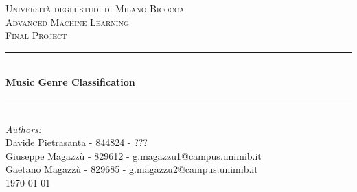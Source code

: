 \begin{titlepage}

    \newcommand{\HRule}{\rule{\linewidth}{0.5mm}} %

    \center %


    \textsc{\LARGE Università degli studi di Milano-Bicocca}\\[1cm] %
    \textsc{\Large Advanced Machine Learning }\\[0.3cm] %
    \textsc{\large Final Project}\\[0.1cm] %


    \HRule \\[0.4cm]
    { \huge \bfseries Music Genre Classification}\\[0.4cm] %
    \HRule \\[1.5cm]


    \large
    \emph{Authors:}\\
    Davide Pietrasanta - 844824 - ??? \\   %
    Giuseppe Magazzù - 829612 - g.magazzu1@campus.unimib.it   \\ %
    Gaetano Magazzù - 829685 - g.magazzu2@campus.unimib.it   \\[0.4cm] %


    {\large \today}\\[2cm] %


\end{titlepage}
